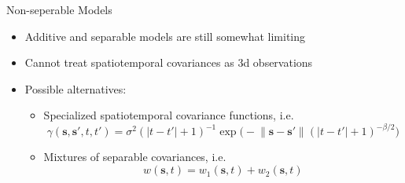 \documentclass[11pt,ignorenonframetext,]{beamer}
\providecommand{\tightlist}{%
  \setlength{\itemsep}{0pt}\setlength{\parskip}{0pt}}
\begin{document}
\begin{frame}[t]{Non-seperable Models}
\protect\hypertarget{non-seperable-models}{}

\begin{itemize}
\tightlist
\item
  Additive and separable models are still somewhat limiting
\end{itemize}

\vspace{2mm}

\begin{itemize}
\tightlist
\item
  Cannot treat spatiotemporal covariances as 3d observations
\end{itemize}

\vspace{2mm}

\begin{itemize}
\item
  Possible alternatives:

  \begin{itemize}
  \item
    Specialized spatiotemporal covariance functions, i.e. \[ 
    \gamma(\symbf{s},\symbf{s}', t,t') 
    = \sigma^2 (\lvert t - t'\rvert+1)^{-1} \exp\big(-\lVert\symbf{s}-\symbf{s}'\rVert (\lvert t-t' \rvert + 1)^{-\beta/2}\big)
    \]
  \item
    Mixtures of separable covariances, i.e. \[
    w(\symbf{s},t) = w_1(\symbf{s},t) + w_2(\symbf{s},t)
    \]
  \end{itemize}
\end{itemize}

\end{frame}
\end{document}
